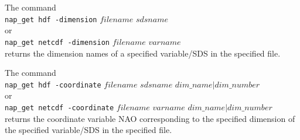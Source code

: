 The command
  \\
  \texttt{nap\_get hdf -dimension} 
  $filename$ $sdsname$
  \\or
  \\
  \texttt{nap\_get netcdf -dimension} 
  $filename$ $varname$
  \\returns the dimension names of a specified variable/SDS in the
  specified file.
  

The command
  \\
  \texttt{nap\_get hdf -coordinate} $filename$ $sdsname$ $dim\_name|dim\_number$
  \\or
  \\
  \texttt{nap\_get netcdf -coordinate} $filename$ $varname$ $dim\_name|dim\_number$
  \\returns the coordinate variable NAO corresponding to the
  specified dimension of the specified variable/SDS in the specified
  file.
